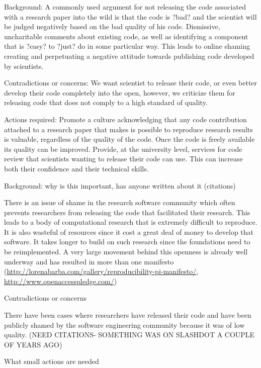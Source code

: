 \documentclass[a4paper,UKenglish]{dagman}
\begin{document}
     Background: A commonly used argument for not releasing the code associated with a research paper into the wild is that the code is ?bad? and the scientist will be judged negatively based on the bad quality of his code. Dismissive, uncharitable comments about existing code, as well as identifying a component that is ?easy? to ?just? do in some particular way. This leads to online shaming creating and perpetuating a negative attitude towards publishing code developed by scientists.

Contradictions or concerns: We want scientist to release their code, or even better develop their code completely into the open, however, we criticize them for releasing code that does not comply to a high standard of quality. 

Actions required: 
Promote a culture acknowledging that any code contribution attached to a research paper that makes is possible to reproduce research results is valuable, regardless of the quality of the code. Once the code is freely available its quality can be improved.
Provide, at the university level, services for code review that scientists wanting to release their code can use. This can increase both their confidence and their technical skills. 



Background: why is this important, has anyone written about it (citations)

There is an issue of shame in the research software community which often prevents researchers from releasing the code that facilitated their research. This leads to a body of computational research that is extremely difficult to reproduce. It is also wasteful of resources since it cost a great deal of money to develop that software. It takes longer to build on such research since the foundations need to be reimplemented. A very large movement behind this openness is already well underway and has resulted in more than one manifesto (\url{http://lorenabarba.com/gallery/reproducibility-pi-manifesto/}, \url{http://www.openaccesspledge.com/})

Contradictions or concerns

There have been cases where researchers have released their code and have been publicly shamed by the software engineering community because it was of low quality. (NEED CITATIONS- SOMETHING WAS ON SLASHDOT A COUPLE OF YEARS AGO)

What small actions are needed
\end{document}
